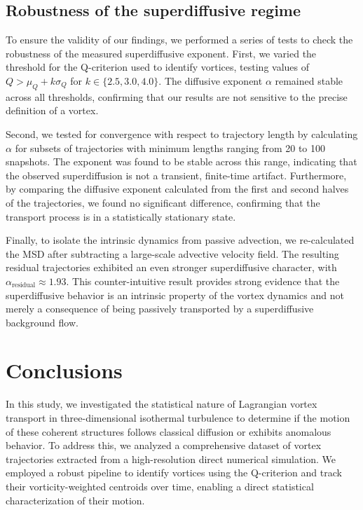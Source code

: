 \documentclass[]{article}
\begin{document}
\subsection{Robustness of the superdiffusive regime}
To ensure the validity of our findings, we performed a series of tests to check the robustness of the measured superdiffusive exponent. First, we varied the threshold for the Q-criterion used to identify vortices, testing values of $Q > \mu_Q + k\sigma_Q$ for $k \in \{2.5, 3.0, 4.0\}$. The diffusive exponent $\alpha$ remained stable across all thresholds, confirming that our results are not sensitive to the precise definition of a vortex.

Second, we tested for convergence with respect to trajectory length by calculating $\alpha$ for subsets of trajectories with minimum lengths ranging from 20 to 100 snapshots. The exponent was found to be stable across this range, indicating that the observed superdiffusion is not a transient, finite-time artifact. Furthermore, by comparing the diffusive exponent calculated from the first and second halves of the trajectories, we found no significant difference, confirming that the transport process is in a statistically stationary state.

Finally, to isolate the intrinsic dynamics from passive advection, we re-calculated the MSD after subtracting a large-scale advective velocity field. The resulting residual trajectories exhibited an even stronger superdiffusive character, with $\alpha_{\text{residual}} \approx 1.93$. This counter-intuitive result provides strong evidence that the superdiffusive behavior is an intrinsic property of the vortex dynamics and not merely a consequence of being passively transported by a superdiffusive background flow.

\section{Conclusions}
\label{sec:conclusions}


In this study, we investigated the statistical nature of Lagrangian vortex transport in three-dimensional isothermal turbulence to determine if the motion of these coherent structures follows classical diffusion or exhibits anomalous behavior. To address this, we analyzed a comprehensive dataset of vortex trajectories extracted from a high-resolution direct numerical simulation. We employed a robust pipeline to identify vortices using the Q-criterion and track their vorticity-weighted centroids over time, enabling a direct statistical characterization of their motion.
\end{document}
